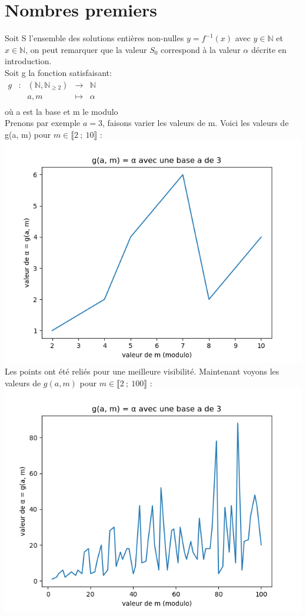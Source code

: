 \documentclass{article}
\begin{document}
\section{Nombres premiers}
Soit S l'ensemble des solutions entières non-nulles $y=f^{-1}(x)$ avec $y\in\mathbb{N}$ et $x\in\mathbb{N}$, on peut remarquer que la valeur $S_0$ correspond à la valeur $\alpha$ décrite en introduction.\\
Soit g la fonction satisfaisant:\\
$\begin{array}{ccccc}
g & : & (\mathbb{N}, \mathbb{N}_{\geq 2}) & \to & \mathbb{N} \\
 & & a,m & \mapsto & \alpha \\
\end{array}$\\ où a est la base et m le modulo\\
Prenons par exemple $a=3$, faisons varier les valeurs de m. Voici les valeurs de g(a, m) pour $m\in\llbracket 2~;~10 \rrbracket$ :\\
\includegraphics{Figure_1.png}\\
Les points ont été reliés pour une meilleure visibilité. Maintenant voyons les valeurs de $g(a,m)$ pour $m\in\llbracket 2~;~100 \rrbracket$ :\\
\includegraphics{Figure_2.png}\\
\end{document}
